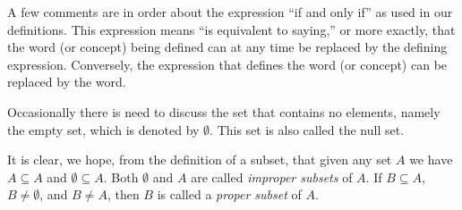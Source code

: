 \documentclass[10pt,]{book}
\theoremstyle{plain}
\theoremstyle{definition}
\begin{document}
A few comments are in order about the expression ``if and only if'' as used in our definitions. This expression means ``is equivalent to saying,''
or more exactly, that the word (or concept) being defined can at any time be replaced by the defining expression. Conversely, the expression that
defines the word (or concept) can be replaced by the word. %
\par
Occasionally there is need to discuss the set that contains no elements, namely the empty set, which is denoted by \(\emptyset\).
This set is also called the null set.%
\par
It is clear, we hope, from the definition of a subset, that given any set \( A\) we have \(A\subseteq A\) and \(\emptyset \subseteq A\). Both
\(\emptyset\) and \( A\) are called \emph{improper subsets }of \(A\). If \(B \subseteq  A\), \(B\neq \emptyset\), and \(B\neq A\),
then \(B\) is called a \emph{ proper subset} of \(A\).%
\typeout{************************************************}
\typeout{************************************************}
\end{document}
